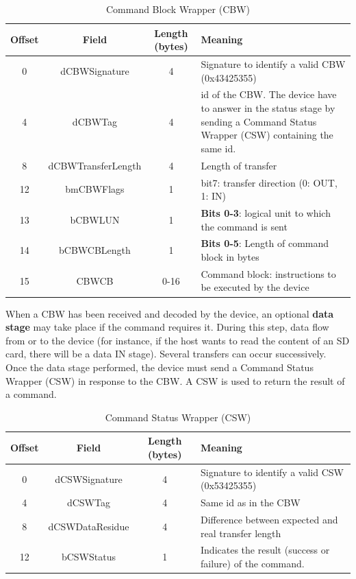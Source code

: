 \documentclass[pdftex,10pt,a4paper]{report}
\begin{document}
\begin{table}[h!]
\centering
\begin{tabular}{|c|c|c| >{\arraybackslash}m{9cm} |}
\hline

Offset & Field & Length (bytes) & Meaning \\ \hline
0 & dCBWSignature & 4 & Signature to identify a valid CBW (0x43425355) \\ \hline
4 & dCBWTag & 4 &  id of the CBW. The device have to answer in the status stage by sending a Command Status Wrapper (CSW) containing the same id. \\ \hline
8 & dCBWTransferLength & 4 & Length of transfer \\ \hline
12 & bmCBWFlags & 1 & bit7: transfer direction (0: OUT, 1: IN) \\ \hline
13 & bCBWLUN & 1 & \textbf{Bits 0-3}: logical unit to which the command is sent \\ \hline
14 & bCBWCBLength & 1 & \textbf{Bits 0-5}: Length of command block in bytes \\ \hline
15 & CBWCB & 0-16 & Command block: instructions to be executed by the device \\ \hline

\end{tabular}
\caption{Command Block Wrapper (CBW)}
\label{Command Block Wrapper (CBW)}
\end{table}

When a CBW has been received and decoded by the device, an optional \textbf{data stage} may take
place if the command requires it. During this step, data flow from or to the device (for instance, if the host wants to read the content of an SD card, there will be a data IN stage). Several transfers can occur successively.
\\

Once the data stage performed, the device must send a Command Status Wrapper (CSW) in response to the CBW. A CSW is used to return the result of a command.

\begin{table}[h!]
\centering
\begin{tabular}{|c|c|c| >{\arraybackslash}m{9cm} |}
\hline

Offset & Field & Length (bytes) & Meaning \\ \hline
0 & dCSWSignature & 4 & Signature to identify a valid CSW (0x53425355) \\ \hline
4 & dCSWTag & 4 &  Same id as in the CBW \\ \hline
8 & dCSWDataResidue & 4 & Difference between expected and real transfer length \\ \hline
12 & bCSWStatus & 1 & Indicates the result (success or failure) of the command. \\ \hline

\end{tabular}
\caption{Command Status Wrapper (CSW)}
\label{Command Status Wrapper (CSW)}
\end{table}
\end{document}
